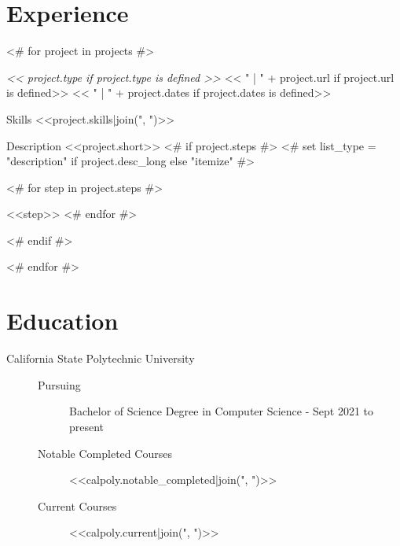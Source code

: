 \documentclass[a4paper,10pt]{extarticle}
\begin{document}

\section*{Experience}
\begin{description}
        <# for project in projects #>
    \item[<<project.name>>] \textit{<< project.type if project.type is defined >>} << " | " + project.url if project.url is defined>> << " | " + project.dates if project.dates is defined>>
        \begin{projects}
        \item [ Skills ] <<project.skills|join(", ")>>
        \item [ Description ] <<project.short>>
            <# if project.steps #>
            <# set list_type = "description" if project.desc_long else "itemize" #>
            \begin{<<list_type>>} %
                    <# for step in project.steps #>
                \item <<step>>
                    <# endfor #>
            \end{<<list_type>>}
            <# endif #>
        \end{projects}
        <# endfor #>
\end{description}

\section*{Education}
\begin{description}
    \item [ California State Polytechnic University ]\mbox{}
        \begin{description}
            \item [Pursuing] Bachelor of Science Degree in Computer Science - Sept 2021 to present
            \item [Notable Completed Courses] <<calpoly.notable_completed|join(", ")>>
            \item [Current Courses] <<calpoly.current|join(", ")>>
        \end{description}
\end{description}
\end{document}
